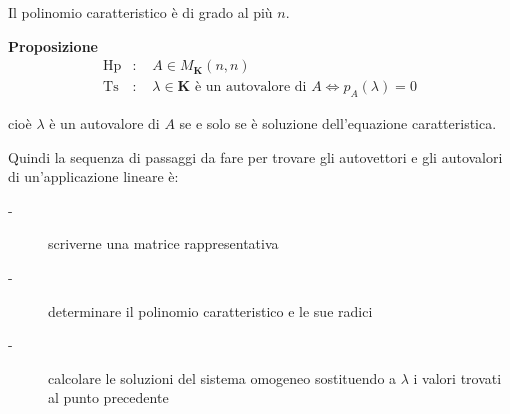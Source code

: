 \documentclass{article}
\begin{document}
Il polinomio caratteristico \`{e} di grado al pi\`{u} $n$.

\textbf{Proposizione}%
\begin{eqnarray*}
\text{Hp} &\text{: }&A\in M_{\mathbf{K}}\left( n,n\right) \\
\text{Ts} &\text{: }&\lambda \in \mathbf{K}\text{ \`{e} un autovalore di }%
A\Longleftrightarrow p_{A}\left( \lambda \right) =0
\end{eqnarray*}

cio\`{e} $\lambda $ \`{e} un autovalore di $A$ se e solo se \`{e} soluzione
dell'equazione caratteristica.

Quindi la sequenza di passaggi da fare per trovare gli autovettori e gli
autovalori di un'applicazione lineare \`{e}:

\begin{description}
\item[-] scriverne una matrice rappresentativa

\item[-] determinare il polinomio caratteristico e le sue radici

\item[-] calcolare le soluzioni del sistema omogeneo sostituendo a $\lambda $
i valori trovati al punto precedente
\end{description}
\end{document}

